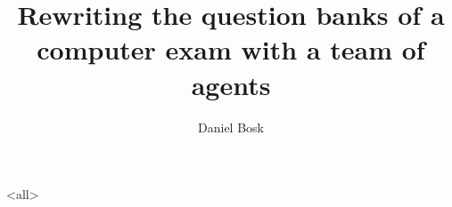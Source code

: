 \documentclass[ignoreframetext]{beamer}
\begin{document}
\title[Rewriting exam banks with agents]{%
  Rewriting the question banks of a computer exam with a team of agents
}
\author{Daniel Bosk}

\begin{frame}
  \maketitle
\end{frame}

\mode<all>

\mode*
%
\end{document}
